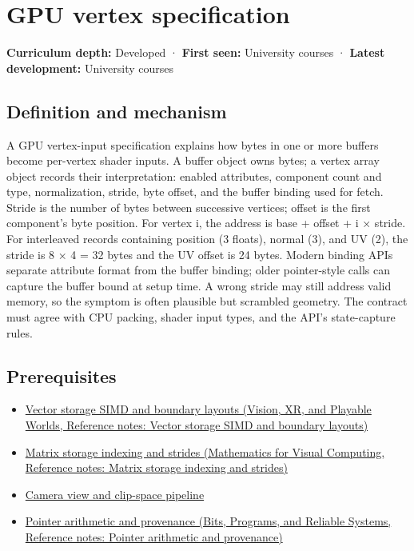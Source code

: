\hypertarget{appendix-749ba51a6c25}{}\label{referencestart:appendix-749ba51a6c25}
\section{GPU vertex specification}\label{appendix-749ba51a6c25-gpu-vertex-specification}

\textbf{Curriculum depth:} Developed · \textbf{First seen:} University courses · \textbf{Latest development:} University courses

\begin{allmightroledefinition}

\subsection{Definition and mechanism}\label{appendix-749ba51a6c25-definition-and-mechanism}

A GPU vertex-input specification explains how bytes in one or more buffers become per-vertex shader inputs. A buffer object owns bytes; a vertex array object records their interpretation: enabled attributes, component count and type, normalization, stride, byte offset, and the buffer binding used for fetch. Stride is the number of bytes between successive vertices; offset is the first component's byte position. For vertex i, the address is base + offset + i × stride. For interleaved records containing position (3 floats), normal (3), and UV (2), the stride is 8 × 4 = 32 bytes and the UV offset is 24 bytes. Modern binding APIs separate attribute format from the buffer binding; older pointer-style calls can capture the buffer bound at setup time. A wrong stride may still address valid memory, so the symptom is often plausible but scrambled geometry. The contract must agree with CPU packing, shader input types, and the API's state-capture rules.

\end{allmightroledefinition}

\subsection{Prerequisites}\label{appendix-749ba51a6c25-prerequisites}

\begin{itemize}
\tightlist
\item
  \href{../07-Vision-XR-and-Playable-Worlds/main.pdf\#nameddest=appendix-26bf6bf2fb8b}{Vector storage SIMD and boundary layouts (Vision, XR, and Playable Worlds, Reference notes: Vector storage SIMD and boundary layouts)}
\item
  \href{../02-Mathematics-for-Visual-Computing/main.pdf\#nameddest=appendix-ffdc1d4e5350}{Matrix storage indexing and strides (Mathematics for Visual Computing, Reference notes: Matrix storage indexing and strides)}
\item
  \hyperref[appendix-1c07d64f5e70]{Camera view and clip-space pipeline}
\item
  \href{../01-Bits-Programs-and-Reliable-Systems/main.pdf\#nameddest=appendix-6af5921bc853}{Pointer arithmetic and provenance (Bits, Programs, and Reliable Systems, Reference notes: Pointer arithmetic and provenance)}
\end{itemize}

